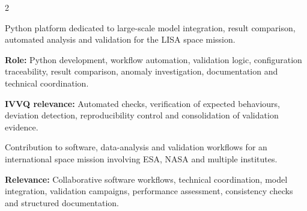 \documentclass[8pt,a4paper,ragged2e,withhyper]{altacv}
\begin{document}
\begin{paracol}{2}

\divider

\divider

\medskip


\divider

\divider

\divider




\end{paracol}



Python platform dedicated to large-scale model integration, result comparison, automated analysis and validation for the LISA space mission.

\textbf{Role:} Python development, workflow automation, validation logic, configuration traceability, result comparison, anomaly investigation, documentation and technical coordination.

\textbf{IVVQ relevance:} Automated checks, verification of expected behaviours, deviation detection, reproducibility control and consolidation of validation evidence.

\divider


Contribution to software, data-analysis and validation workflows for an international space mission involving ESA, NASA and multiple institutes.

\textbf{Relevance:} Collaborative software workflows, technical coordination, model integration, validation campaigns, performance assessment, consistency checks and structured documentation.
\end{document}

